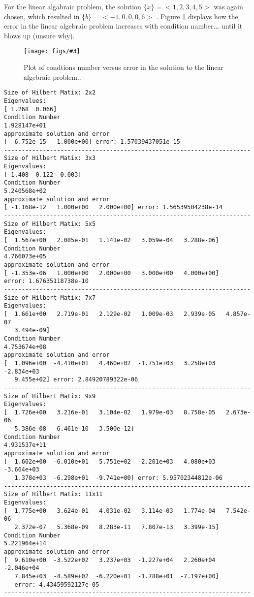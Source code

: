 \documentclass[letterpaper, 10pt, oneside]{article}
\newcommand{\Figure}[4]{
  \begin{figure}[#1]
    \centering
    \texttt{[image: figs/\#3]}
    \caption{#4.}\label{fig:#3}
  \end{figure}}
\begin{document}
For the linear algabraic problem, the solution $\{x\} = <1,2,3,4,5>$ was again chosen, which resulted in $\{b\} = <-1,0,0,0,6>$ . Figure \ref{fig:plot_4.pdf} displays how the error in the linear algebraic problem increases with condition number... until it blows up (unsure why).

\Figure{htp}{4}{plot_4.pdf}{Plot of condtions number versus error in the solution to the linear algebraic problem.}

\begin{lstlisting}
Size of Hilbert Matix: 2x2
Eigenvalues:
[ 1.268  0.066]
Condition Number
1.928147e+01
approximate solution and error
[ -6.752e-15   1.000e+00] error: 1.57039437051e-15
----------------------------------------------------------------------
Size of Hilbert Matix: 3x3
Eigenvalues:
[ 1.408  0.122  0.003]
Condition Number
5.240568e+02
approximate solution and error
[ -1.168e-12   1.000e+00   2.000e+00] error: 1.56539504238e-14
----------------------------------------------------------------------
Size of Hilbert Matix: 5x5
Eigenvalues:
[  1.567e+00   2.085e-01   1.141e-02   3.059e-04   3.288e-06]
Condition Number
4.766073e+05
approximate solution and error
[ -1.353e-06   1.000e+00   2.000e+00   3.000e+00   4.000e+00] 
error: 1.67635118738e-10
----------------------------------------------------------------------
Size of Hilbert Matix: 7x7
Eigenvalues:
[  1.661e+00   2.719e-01   2.129e-02   1.009e-03   2.939e-05   4.857e-07
   3.494e-09]
Condition Number
4.753674e+08
approximate solution and error
[  1.096e+00  -4.410e+01   4.460e+02  -1.751e+03   3.258e+03  -2.834e+03
   9.455e+02] error: 2.84920789322e-06
----------------------------------------------------------------------
Size of Hilbert Matix: 9x9
Eigenvalues:
[  1.726e+00   3.216e-01   3.104e-02   1.979e-03   8.758e-05   2.673e-06
   5.386e-08   6.461e-10   3.500e-12]
Condition Number
4.931537e+11
approximate solution and error
[  1.602e+00  -6.010e+01   5.751e+02  -2.201e+03   4.080e+03  -3.664e+03
   1.378e+03  -6.298e+01  -9.741e+00] error: 5.95702344812e-06
----------------------------------------------------------------------
Size of Hilbert Matix: 11x11
Eigenvalues:
[  1.775e+00   3.624e-01   4.031e-02   3.114e-03   1.774e-04   7.542e-06
   2.372e-07   5.368e-09   8.283e-11   7.807e-13   3.399e-15]
Condition Number
5.221964e+14
approximate solution and error
[  9.610e+00  -3.522e+02   3.237e+03  -1.227e+04   2.260e+04  -2.046e+04
   7.845e+03  -4.589e+02  -6.220e+01  -1.788e+01  -7.197e+00] 
   error: 4.43459592127e-05
----------------------------------------------------------------------

\end{lstlisting}
\end{document}
